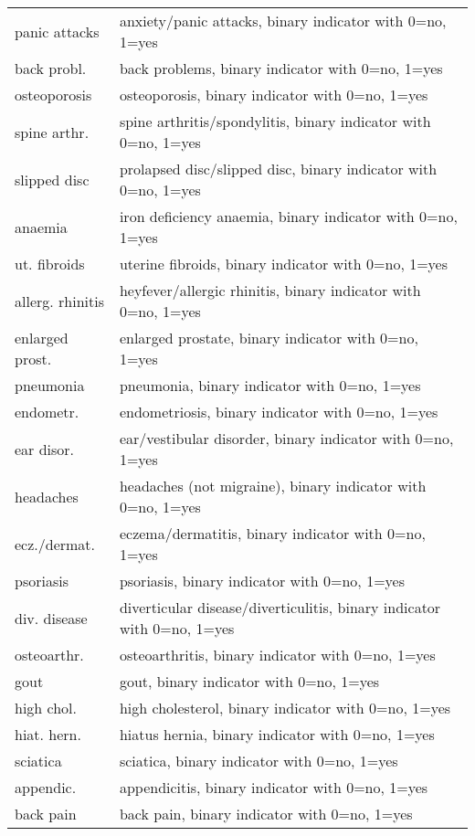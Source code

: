 \begin{longtable}[c]{lp{8cm}}
        panic attacks	&	anxiety/panic attacks, binary indicator with 0=no, 1=yes	\\
        back probl. 	&	back problems, binary indicator with 0=no, 1=yes	\\
        osteoporosis	&	osteoporosis, binary indicator with 0=no, 1=yes	\\
        spine arthr.	&	spine arthritis/spondylitis, binary indicator with 0=no, 1=yes	\\
        slipped disc	&	prolapsed disc/slipped disc, binary indicator with 0=no, 1=yes	\\
        anaemia 	&	iron deficiency anaemia, binary indicator with 0=no, 1=yes	\\
        ut. fibroids	&	uterine fibroids, binary indicator with 0=no, 1=yes	\\
        allerg. rhinitis	&	heyfever/allergic rhinitis, binary indicator with 0=no, 1=yes	\\
        enlarged prost.	&	enlarged prostate, binary indicator with 0=no, 1=yes	\\
        pneumonia	&	pneumonia, binary indicator with 0=no, 1=yes	\\
        endometr.	&	endometriosis, binary indicator with 0=no, 1=yes	\\
        ear disor.	&	ear/vestibular disorder, binary indicator with 0=no, 1=yes	\\
        headaches	&	headaches (not migraine), binary indicator with 0=no, 1=yes	\\
        ecz./dermat.	&	eczema/dermatitis, binary indicator with 0=no, 1=yes	\\
        psoriasis	&	psoriasis, binary indicator with 0=no, 1=yes	\\
        div. disease	&	diverticular disease/diverticulitis, binary indicator with 0=no, 1=yes	\\
        osteoarthr.	&	osteoarthritis, binary indicator with 0=no, 1=yes	\\
        gout	&	gout, binary indicator with 0=no, 1=yes	\\
        high chol.	&	high cholesterol, binary indicator with 0=no, 1=yes	\\
        hiat. hern.	&	hiatus hernia, binary indicator with 0=no, 1=yes	\\
        sciatica	&	sciatica, binary indicator with 0=no, 1=yes	\\
        appendic.	&	appendicitis, binary indicator with 0=no, 1=yes	\\
        back pain	&	back pain, binary indicator with 0=no, 1=yes	\\

\end{longtable}
